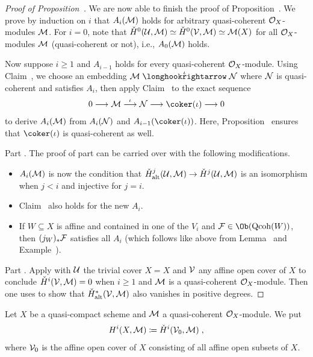 \documentclass[a4paper,parskip=half,numbers=enddot, DIV=12]{scrreprt}
\begin{document}
\begin{proof}[Proof of Proposition~]
	We are now able to finish the proof of Proposition~. We prove by induction on $i$ that $A_i(\mathcal{M})$ holds for arbitrary quasi-coherent $\mathcal{O}_X$-modules $\mathcal{M}$.  For $i=0$, note that $\check{H}^0(\mathcal{U},\mathcal{M})\simeq \check{H}^0(\mathcal{V},\mathcal{M})\simeq \mathcal{M}(X)$ for all $\mathcal{O}_X$-modules $\mathcal{M}$ (quasi-coherent or not), i.e., $A_0(\mathcal{M})$ holds. 
	
	Now suppose $i\geq 1$ and $A_{i-1}$ holds for every quasi-coherent $\mathcal{O}_X$-module. Using Claim~, we choose an embedding $\Mm\monomorphism[\iota]\Nn$ where $\mathcal{N}$ is quasi-coherent and satisfies $A_i$, then apply Claim~ to the exact sequence
	\begin{align*}
		0\morphism\Mm\morphism[\iota]\Nn\morphism\coker(\iota)\morphism 0
	\end{align*}
	to derive $A_i(\mathcal{M})$ from $A_i(\mathcal{N})$ and $A_{i-1}(\coker(\iota))$. Here, Proposition~ ensures that $\coker(\iota)$ is quasi-coherent as well.
	
	Part . The proof of part  can be carried over with the following modifications.
	\begin{itemize}
		\item $A_i(\mathcal{M})$ is now the condition that $\check{H}_\alt^j(\Uu,\Mm)\morphism \check{H}^j(\Uu,\Mm)$ is an isomorphism when $j<i$ and injective for $j=i$.
		\item Claim~ also holds for the new $A_i$.
		\item If $W\subseteq X$ is affine and contained in one of the $V_i$ and $\Ff\in\Ob(\cat{Qcoh}(W))$, then $(j_W)_*\mathcal{F}$ satisfies all $A_i$ (which follows like above from Lemma~ and Example~).
	\end{itemize}
	
	Part . Apply  with $\mathcal{U}$ the trivial cover $X=X$ and $\mathcal{V}$ any affine open cover of $X$ to conclude $\check{H}^i(\mathcal{V},\mathcal{M})=0$ when $i\geq 1$ and $\mathcal{M}$ is a quasi-coherent $\mathcal{O}_X$-module. Then one uses  to show that $\check{H}_{\mathrm{alt}}^*(\mathcal{V},\mathcal{M})$ also vanishes in positive degrees.
\end{proof}
\begin{defi}
	Let $X$ be a quasi-compact scheme and $\mathcal{M}$ a quasi-coherent $\mathcal{O}_X$-module. We put
	\begin{align*}
		H^i(X,\mathcal{M})\coloneqq \check{H}^i(\mathcal{V}_0,\mathcal{M})\;,
	\end{align*}
	where $\mathcal{V}_0$ is the affine open cover of $X$ consisting of all affine open subsets of $X$.
\end{defi}
\end{document}
